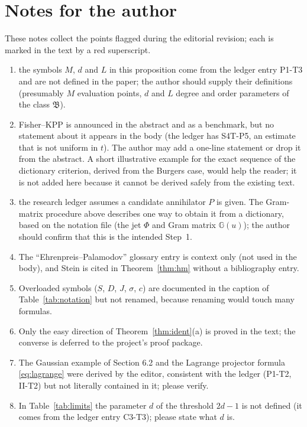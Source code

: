 \documentclass[11pt,a4paper]{article}
\theoremstyle{definition}
\begin{document}
\section{Notes for the author}\label{app:ednotes}
These notes collect the points flagged during the editorial revision; each is marked in the text by a red superscript.
\begin{enumerate}[label=\textbf{E\arabic*.},leftmargin=1.1cm]
\item the symbols $M$, $d$ and $L$ in this proposition come from the ledger entry P1-T3 and are not defined in the paper; the author should supply their definitions (presumably $M$ evaluation points, $d$ and $L$ degree and order parameters of the class $\mathfrak B$).
\item Fisher--KPP is announced in the abstract and as a benchmark, but no statement about it appears in the body (the ledger has S4T-P5, an estimate that is not uniform in $t$). The author may add a one-line statement or drop it from the abstract. A short illustrative example for the exact sequence of the dictionary criterion, derived from the Burgers case, would help the reader; it is not added here because it cannot be derived safely from the existing text.
\item the research ledger assumes a candidate annihilator $P$ is given. The Gram-matrix procedure above describes one way to obtain it from a dictionary, based on the notation file (the jet $\Phi$ and Gram matrix $\mathbb G(u)$); the author should confirm that this is the intended Step~1.
\item The ``Ehrenpreis--Palamodov'' glossary entry is context only (not used in the body), and Stein is cited in Theorem~\ref{thm:hm} without a bibliography entry.
\item Overloaded symbols ($S$, $D$, $J$, $\sigma$, $c$) are documented in the caption of Table~\ref{tab:notation} but not renamed, because renaming would touch many formulas.
\item Only the easy direction of Theorem~\ref{thm:ident}(a) is proved in the text; the converse is deferred to the project's proof package.
\item The Gaussian example of Section 6.2 and the Lagrange projector formula \eqref{eq:lagrange} were derived by the editor, consistent with the ledger (P1-T2, II-T2) but not literally contained in it; please verify.
\item In Table~\ref{tab:limits} the parameter $d$ of the threshold $2d-1$ is not defined (it comes from the ledger entry C3-T3); please state what $d$ is.

\end{enumerate}
\end{document}
